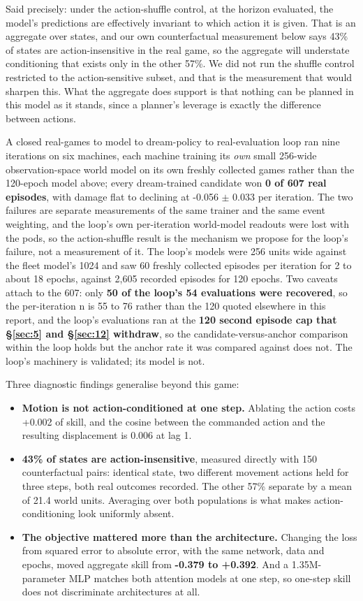 \documentclass[11pt]{article}
\begin{document}
Said precisely: under the action-shuffle control, at the horizon evaluated, the model's predictions are effectively invariant to which action it is given. That is an aggregate over states, and our own counterfactual measurement below says 43\% of states are action-insensitive in the real game, so the aggregate will understate conditioning that exists only in the other 57\%. We did not run the shuffle control restricted to the action-sensitive subset, and that is the measurement that would sharpen this. What the aggregate does support is that nothing can be planned in this model as it stands, since a planner's leverage is exactly the difference between actions.

A closed real-games to model to dream-policy to real-evaluation loop ran nine iterations on six machines, each machine training its \emph{own} small 256-wide observation-space world model on its own freshly collected games rather than the 120-epoch model above; every dream-trained candidate won \textbf{0 of 607 real episodes}, with damage flat to declining at -0.056 $\pm$ 0.033 per iteration. The two failures are separate measurements of the same trainer and the same event weighting, and the loop's own per-iteration world-model readouts were lost with the pods, so the action-shuffle result is the mechanism we propose for the loop's failure, not a measurement of it. The loop's models were 256 units wide against the fleet model's 1024 and saw 60 freshly collected episodes per iteration for 2 to about 18 epochs, against 2,605 recorded episodes for 120 epochs. Two caveats attach to the 607: only \textbf{50 of the loop's 54 evaluations were recovered}, so the per-iteration n is 55 to 76 rather than the 120 quoted elsewhere in this report, and the loop's evaluations ran at the \textbf{120 second episode cap that \S\ref{sec:5} and \S\ref{sec:12} withdraw}, so the candidate-versus-anchor comparison within the loop holds but the anchor rate it was compared against does not. The loop's machinery is validated; its model is not.

Three diagnostic findings generalise beyond this game:

\begin{itemize}
\item \textbf{Motion is not action-conditioned at one step.} Ablating the action costs +0.002 of skill, and the cosine between the commanded action and the resulting displacement is 0.006 at lag 1.
\item \textbf{43\% of states are action-insensitive}, measured directly with 150 counterfactual pairs: identical state, two different movement actions held for three steps, both real outcomes recorded. The other 57\% separate by a mean of 21.4 world units. Averaging over both populations is what makes action-conditioning look uniformly absent.
\item \textbf{The objective mattered more than the architecture.} Changing the loss from squared error to absolute error, with the same network, data and epochs, moved aggregate skill from \textbf{-0.379 to +0.392}. And a 1.35M-parameter MLP matches both attention models at one step, so one-step skill does not discriminate architectures at all.
\end{itemize}
\end{document}
